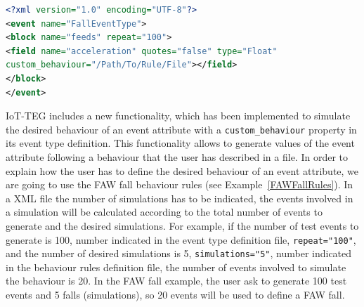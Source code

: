 \documentclass[review]{elsarticle}
\begin{document}
\begin{lstlisting}[basicstyle=\ttfamily\footnotesize,language=XML,caption={Fall event type definition},label=FallEvent]
<?xml version="1.0" encoding="UTF-8"?>
<event name="FallEventType">
<block name="feeds" repeat="100">
<field name="acceleration" quotes="false" type="Float" 
custom_behaviour="/Path/To/Rule/File"></field>
</block>
</event>
\end{lstlisting}

IoT-TEG includes a new functionality, which has been implemented to simulate the desired behaviour of an 
event attribute with a \texttt{custom\_behaviour} property in its event type definition. This functionality 
allows to generate values of the event attribute following a behaviour that the user has described in a file.
In order to explain how the user has to define the desired behaviour of an event attribute, we are going
to use the FAW fall behaviour rules (see Example~\ref{FAWFallRules}). In a XML file the number of simulations has to be
indicated, the events involved in a simulation will be calculated according to the total number of events
to generate and the desired simulations. For example, if the number of test events to generate is 100, 
number indicated in the event type definition file, \texttt{repeat="100"}, and the number of desired 
simulations is 5, \texttt{simulations="5"}, number indicated in the behaviour rules definition file, 
the number of events involved to simulate the behaviour is 20. In the FAW fall example, the user ask to 
generate 100 test events and 5 falls (simulations), so 20 events will be used to define a FAW fall.
\end{document}
